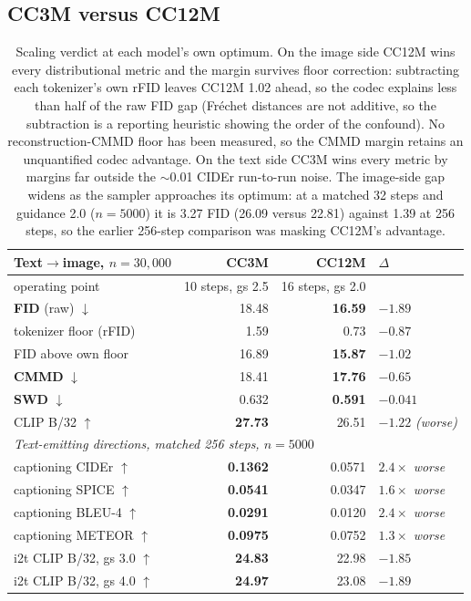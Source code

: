 \subsection{CC3M versus CC12M}
\label{app:image:scaling}

\begin{table}[tb]
\centering
\small
\begin{tabular}{lrrl}
\toprule
Text$\rightarrow$image, $n{=}30{,}000$ & \textbf{CC3M} & \textbf{CC12M} & $\Delta$ \\
\midrule
operating point & 10 steps, gs 2.5 & 16 steps, gs 2.0 & \\
\midrule
\textbf{FID} (raw) $\downarrow$ & 18.48 & \textbf{16.59} & $-1.89$ \\
\quad tokenizer floor (rFID) & 1.59 & 0.73 & $-0.87$ \\
\quad FID above own floor & 16.89 & \textbf{15.87} & $\mathbf{-1.02}$ \\
\textbf{CMMD} $\downarrow$ & 18.41 & \textbf{17.76} & $-0.65$ \\
\textbf{SWD} $\downarrow$ & 0.632 & \textbf{0.591} & $-0.041$ \\
CLIP B/32 $\uparrow$ & \textbf{27.73} & 26.51 & $-1.22$ \emph{(worse)} \\
\midrule
\multicolumn{4}{l}{\emph{Text-emitting directions, matched 256 steps, $n{=}5000$}}\\
captioning CIDEr $\uparrow$ & \textbf{0.1362} & 0.0571 & $2.4\times$ \emph{worse} \\
captioning SPICE $\uparrow$ & \textbf{0.0541} & 0.0347 & $1.6\times$ \emph{worse} \\
captioning BLEU-4 $\uparrow$ & \textbf{0.0291} & 0.0120 & $2.4\times$ \emph{worse} \\
captioning METEOR $\uparrow$ & \textbf{0.0975} & 0.0752 & $1.3\times$ \emph{worse} \\
i2t CLIP B/32, gs 3.0 $\uparrow$ & \textbf{24.83} & 22.98 & $-1.85$ \\
i2t CLIP B/32, gs 4.0 $\uparrow$ & \textbf{24.97} & 23.08 & $-1.89$ \\
\bottomrule
\end{tabular}
\caption{Scaling verdict at each model's own optimum. On the image side CC12M wins every
distributional metric and the margin survives floor correction: subtracting each tokenizer's own
rFID leaves CC12M 1.02 ahead, so the codec explains less than half of the raw FID gap (Fr\'echet
distances are not additive, so the subtraction is a reporting heuristic showing the order of the
confound). No reconstruction-CMMD floor has been measured, so the CMMD margin retains an
unquantified codec advantage. On the text side CC3M wins every metric by margins far outside the
$\sim$0.01 CIDEr run-to-run noise. The image-side gap widens as the sampler approaches its
optimum: at a matched 32 steps and guidance 2.0 ($n{=}5000$) it is 3.27 FID (26.09 versus 22.81)
against 1.39 at 256 steps, so the earlier 256-step comparison was masking CC12M's advantage.}
\label{tab:app:image:scaling-verdict}
\end{table}

